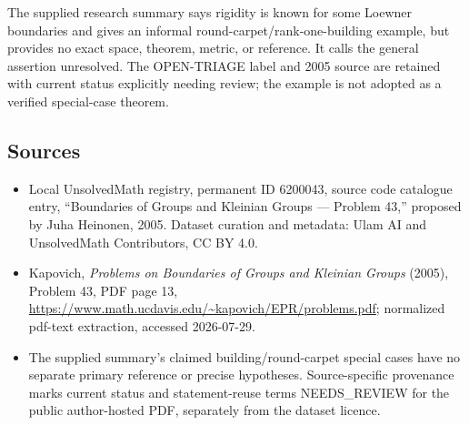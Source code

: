 \documentclass[11pt]{article}
\begin{document}
The supplied research summary says rigidity is known for some Loewner boundaries and gives an informal round-carpet/rank-one-building example, but provides no exact space, theorem, metric, or reference. It calls the general assertion unresolved. The OPEN-TRIAGE label and 2005 source are retained with current status explicitly needing review; the example is not adopted as a verified special-case theorem.
\subsection{Sources}
\begin{itemize}
\item Local UnsolvedMath registry, permanent ID 6200043, source code catalogue entry, ``Boundaries of Groups and Kleinian Groups --- Problem 43,'' proposed by Juha Heinonen, 2005. Dataset curation and metadata: Ulam AI and UnsolvedMath Contributors, CC BY 4.0.
\item Kapovich, \emph{Problems on Boundaries of Groups and Kleinian Groups} (2005), Problem 43, PDF page 13, \url{https://www.math.ucdavis.edu/~kapovich/EPR/problems.pdf}; normalized pdf-text extraction, accessed 2026-07-29.
\item The supplied summary's claimed building/round-carpet special cases have no separate primary reference or precise hypotheses. Source-specific provenance marks current status and statement-reuse terms NEEDS\_REVIEW for the public author-hosted PDF, separately from the dataset licence.
\end{itemize}
\end{document}
